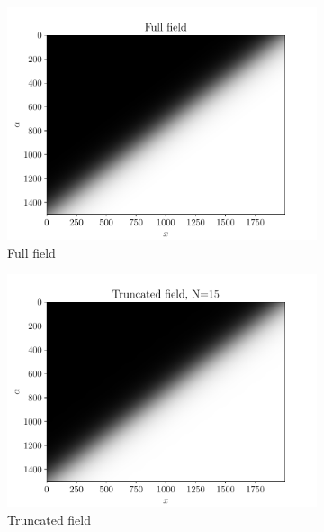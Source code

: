 \begin{figure}
\begin{subfigure}[t]{0.5\linewidth}
    \centering
    \includegraphics[width=\linewidth]{Figures/FullField_Tanh.pdf}
    \caption{Full field}
\end{subfigure}
  \begin{subfigure}[t]{0.5\linewidth}
    \centering
    \includegraphics[width=\linewidth]{Figures/TruncatedField_15_Tanh.pdf}
    \caption{Truncated field}
\end{subfigure}  
  \begin{subfigure}[t]{0.5\linewidth}
    \centering

\end{subfigure}
\end{figure}
